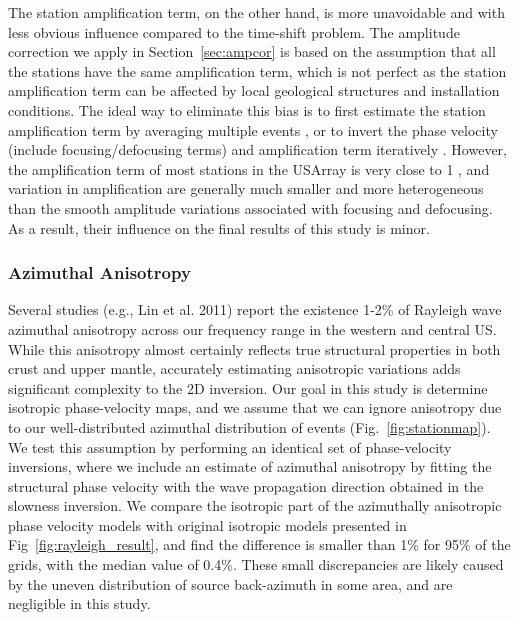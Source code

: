 The station amplification term, on the other hand, is more unavoidable and with less obvious influence compared to the time-shift problem.  The amplitude correction we apply in Section~\ref{sec:ampcor} is based on the assumption that all the stations have the same amplification term, which is not perfect as the station amplification term can be affected by local geological structures and installation conditions. The ideal way to eliminate this bias is to first estimate the station amplification term by averaging multiple events \citep{Eddy:2014io}, or to invert the phase velocity (include focusing/defocusing terms) and amplification term iteratively \cite{Lin:2012bc}. However, the amplification term of most stations in the USArray is very close to 1 \citep{Eddy:2014io}, and variation in amplification are generally much smaller and more heterogeneous than the smooth amplitude variations associated with focusing and defocusing.  As a result, their influence on the final results of this study is minor.

\subsubsection{Azimuthal Anisotropy}

Several studies (e.g., Lin et al. 2011) report the existence 1-2\% of Rayleigh wave azimuthal anisotropy across our frequency range in the western and central US. 
While this anisotropy almost certainly reflects true structural properties in both crust and upper mantle, accurately estimating anisotropic variations adds significant complexity to the 2D inversion.  Our goal in this study is determine isotropic phase-velocity maps, and we assume that we can ignore anisotropy due to our well-distributed azimuthal distribution of events (Fig.~\ref{fig:stationmap}).  We test this assumption by performing an identical set of phase-velocity inversions, where we include an estimate of azimuthal anisotropy by fitting the structural phase velocity with the wave propagation direction obtained in the slowness inversion. We compare the isotropic part of the azimuthally anisotropic phase velocity models with original isotropic models presented in Fig~\ref{fig:rayleigh_result}, and find the difference is smaller than 1\% for 95\% of the grids, with the median value of 0.4\%. These small discrepancies are likely caused by the uneven distribution of source back-azimuth in some area, and are negligible in this study.


